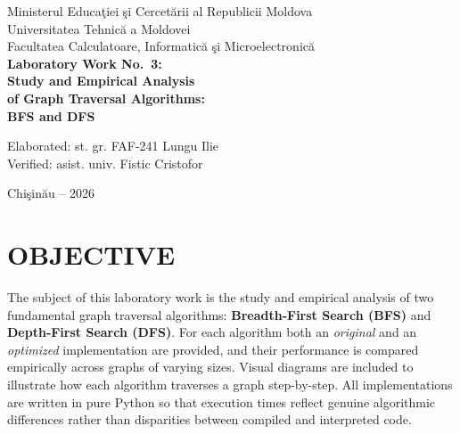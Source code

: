 \documentclass[12pt,a4paper]{article}
\begin{document}
	
	\begin{titlepage}
		\centering
		\vspace*{1cm}
		{\Large Ministerul Educa\c{t}iei \c{s}i Cercet\u{a}rii al Republicii Moldova\\}
		\vspace{0.5cm}
		{\Large Universitatea Tehnic\u{a} a Moldovei\\}
		\vspace{0.3cm}
		{\Large Facultatea Calculatoare, Informatic\u{a} \c{s}i Microelectronic\u{a}\\}
		\vspace{3cm}
		{\LARGE\bfseries Laboratory Work No.~3:\\}
		\vspace{0.5cm}
		{\LARGE\bfseries Study and Empirical Analysis\\}
		\vspace{0.3cm}
		{\LARGE\bfseries of Graph Traversal Algorithms:\\}
		\vspace{0.3cm}
		{\LARGE\bfseries BFS and DFS\\}
		\vspace{4cm}
		\begin{flushleft}
			\hspace{6cm}Elaborated: st. gr. FAF-241 Lungu Ilie\\
			\vspace{1cm}
			\hspace{6cm}Verified: asist. univ. Fistic Cristofor\\
		\end{flushleft}
		\vfill
		{\large Chi\c{s}in\u{a}u -- 2026}
	\end{titlepage}
	
	\newpage
	\tableofcontents
	\newpage
	
	\section{OBJECTIVE}
	
	The subject of this laboratory work is the study and empirical analysis of two
	fundamental graph traversal algorithms: \textbf{Breadth-First Search (BFS)} and
	\textbf{Depth-First Search (DFS)}. For each algorithm both an \emph{original} and
	an \emph{optimized} implementation are provided, and their performance is compared
	empirically across graphs of varying sizes. Visual diagrams are included to
	illustrate how each algorithm traverses a graph step-by-step. All implementations
	are written in pure Python so that execution times reflect genuine algorithmic
	differences rather than disparities between compiled and interpreted code.
	
\end{document}
